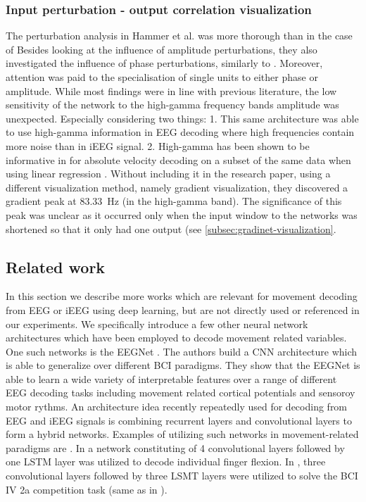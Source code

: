 \subsubsection{Input perturbation - output correlation visualization}
The perturbation analysis in Hammer et al. was more thorough than in the case of \cite{schirrmeister-deep-2017} 
Besides looking at the influence of amplitude perturbations, they also investigated the influence of phase perturbations, similarly to \cite{hartmann-hierarchical-2018}.
Moreover, attention was paid to the specialisation of single units to either phase or amplitude.
While most findings were in line with previous literature, the low sensitivity of the network to the high-gamma frequency bands amplitude was unexpected.  
Especially considering two things: 
1. This same architecture was able to use high-gamma information in EEG decoding where high frequencies contain more noise than in iEEG signal.
2. High-gamma has been shown to be informative in for absolute velocity decoding on a subset of the same data when using linear regression \cite{hammer-predominance-2016}.
Without including it in the research paper, using a different visualization method, namely gradient visualization, they discovered a gradient peak at 83.33~Hz (in the high-gamma band).
The significance of this peak was unclear as it occurred only when the input window to the networks was shortened so that it only had one output (see \ref{subsec:gradinet-visualization}.


\subsection{Related work}
In this section we describe more works which are relevant for movement decoding from EEG or iEEG using deep learning, but are not directly used or referenced in our experiments.
We specifically introduce a few other neural network architectures which have been employed to decode movement related variables. \\


One such networks is the EEGNet \cite{eeg-net}. The authors build a CNN architecture which is able to generalize over different BCI paradigms.
They show that the EEGNet is able to learn a wide variety of interpretable features over a range of different EEG decoding tasks including movement related cortical potentials and sensoroy motor rythms.
An architecture idea recently repeatedly used for decoding from EEG and iEEG signals is combining recurrent layers and convolutional layers to form a hybrid networks. 
Examples of utilizing such networks in movement-related paradigms are \cite{xie-cnn-lstm-finger-movement, Zhang-2019}.
In \cite{xie-cnn-lstm-finger-movement} a network constituting of 4 convolutional layers followed by one LSTM \cite{lstm-paper} layer was utilized to decode individual finger flexion.
In \cite{Zhang-2019}, three convolutional layers followed by three LSMT layers were utilized to solve the BCI IV 2a competition task (same as in \cite{schirrmeister-deep-2017}). 


